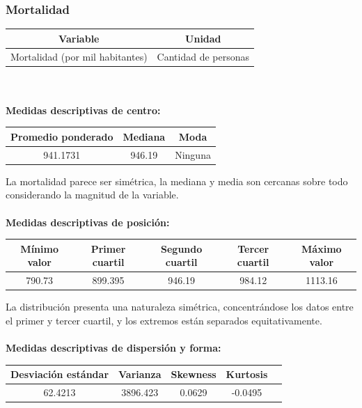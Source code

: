 \documentclass[11pt]{article}
\begin{document}
\subsubsection{Mortalidad}

\begin{center}
\begin{tabular}{|c|c|}
    \hline
    Variable & Unidad  \\ \hline
    Mortalidad (por mil habitantes) & Cantidad de personas \\
    \hline
\end{tabular}
\end{center}
\\
\\

\textbf{Medidas descriptivas de centro:}

\begin{center}
\begin{tabular}{|c|c|c|}
    \hline
    Promedio ponderado & Mediana & Moda \\ \hline
    941.1731 & 946.19 & Ninguna \\
    \hline
\end{tabular}
\end{center}

La mortalidad parece ser simétrica, la mediana y media son cercanas sobre todo considerando la magnitud de la variable.
\\
\\
\textbf{Medidas descriptivas de posición:}

\begin{center}
\begin{tabular}{|c|c|c|c|c|}
    \hline
    Mínimo valor & Primer cuartil & Segundo cuartil & Tercer cuartil & Máximo valor\\ \hline
    790.73 & 899.395 & 946.19 & 984.12 & 1113.16\\
    \hline
\end{tabular}
\end{center}

La distribución presenta una naturaleza simétrica, concentrándose los datos entre el primer y tercer cuartil, y los extremos están separados equitativamente.
\\
\\
\textbf{Medidas descriptivas de dispersión y forma:}

\begin{center}
\begin{tabular}{|c|c|c|c|c|}
    \hline
    Desviación estándar  & Varianza & Skewness & Kurtosis\\ \hline
    62.4213 & 3896.423 & 0.0629 & -0.0495\\
    \hline
\end{tabular}
\end{center}
\end{document}
